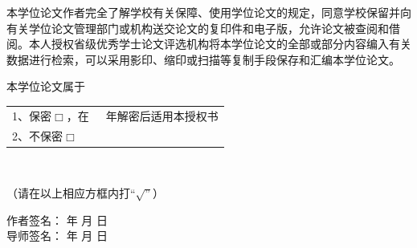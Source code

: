 本学位论文作者完全了解学校有关保障、使用学位论文的规定，同意学校保留并向有关学位论文管理部门或机构送交论文的复印件和电子版，允许论文被查阅和借阅。本人授权省级优秀学士论文评选机构将本学位论文的全部或部分内容编入有关数据进行检索，可以采用影印、缩印或扫描等复制手段保存和汇编本学位论文。\smallskip

本学位论文属于
\begin{tabular}[t]{l}
1、保密$ \Box$，在~~~年解密后适用本授权书  \\ 
2、不保密$ \Box$  \\ 
\end{tabular} \\
\begin{center}
（请在以上相应方框内打“$\surd”$）
\end{center}
\begin{flushright}
 作者签名：  \quad\quad\quad\quad 年 \quad  月  \quad  日\\
导师签名：   \quad\quad\quad\quad 年 \quad  月 \quad   日\\
\end{flushright}
\thispagestyle{empty}
\clearpage

